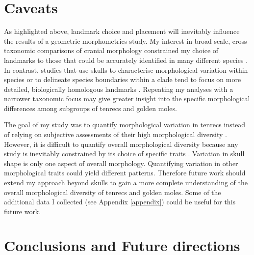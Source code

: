 		
\section{Caveats}
\label{sect:caveats}

	As highlighted above, landmark choice and placement will inevitably influence the results of a geometric morphometrics study. My interest in broad-scale, cross-taxonomic comparisons of cranial morphology constrained my choice of landmarks to those that could be accurately identified in many different species \citep[e.g.][]{Ruta2013, Goswami2011, Wroe2007}. In contrast, studies that use skulls to characterise morphological variation within species \citep[e.g.][]{Blagojevic2011, Bornholdt2008} or to delineate species boundaries within a clade \citep[e.g.][]{Panchetti2008} tend to focus on more detailed, biologically homologous landmarks \citep{Zelditch2012}. Repeating my analyses with a narrower taxonomic focus may give greater insight into the specific morphological differences among subgroups of tenrecs and golden moles.
	
	The goal of my study was to quantify morphological variation in tenrecs instead of relying on subjective assessments of their high morphological diversity \citep{Olson2013, Soarimalala2011, Eisenberg1969}. However, it is difficult to quantify overall morphological diversity because any study is inevitably constrained by its choice of specific traits \citep{Roy1997}. Variation in skull shape is only one aspect of overall morphology. Quantifying variation in other morphological traits could yield different patterns. Therefore future work should extend my approach beyond skulls to gain a more complete understanding of the overall morphological diversity of tenrecs and golden moles. Some of the additional data I collected (see Appendix \ref{appendix}) could be useful for this future work.

\section{Conclusions and Future directions}
\label{sect:concl}

